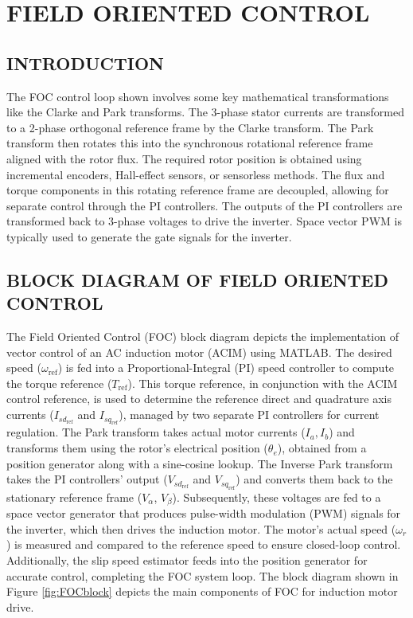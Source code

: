 
\section{\centering FIELD ORIENTED CONTROL}

\subsection{INTRODUCTION}

\hspace{0.2in}The FOC control loop shown involves some key mathematical transformations like the Clarke and Park transforms. The 3-phase stator currents are transformed to a 2-phase orthogonal reference frame by the Clarke transform. The Park transform then rotates this into the synchronous rotational reference frame aligned with the rotor flux. The required rotor position is obtained using incremental encoders, Hall-effect sensors, or sensorless methods. The flux and torque components in this rotating reference frame are decoupled, allowing for separate control through the PI controllers. The outputs of the PI controllers are transformed back to 3-phase voltages to drive the inverter. Space vector PWM is typically used to generate the gate signals for the inverter.
\subsection{BLOCK DIAGRAM OF FIELD ORIENTED CONTROL}

\hspace{0.2in}The Field Oriented Control (FOC) block diagram depicts the implementation of vector control of an AC induction motor (ACIM) using MATLAB. The desired speed ($\omega_{\text{ref}}$) is fed into a Proportional-Integral (PI) speed controller to compute the torque reference ($T_{\text{ref}}$). This torque reference, in conjunction with the ACIM control reference, is used to determine the reference direct and quadrature axis currents ($I_{sd_{\text{ref}}}$ and $I_{sq_{\text{ref}}}$), managed by two separate PI controllers for current regulation. The Park transform takes actual motor currents ($I_a, I_b$) and transforms them using the rotor's electrical position ($\theta_e$), obtained from a position generator along with a sine-cosine lookup. The Inverse Park transform takes the PI controllers' output ($V_{sd_{\text{ref}}}$ and $V_{sq_{\text{ref}}}$) and converts them back to the stationary reference frame ($V_{\alpha}$, $V_{\beta}$). Subsequently, these voltages are fed to a space vector generator that produces pulse-width modulation (PWM) signals for the inverter, which then drives the induction motor. The motor's actual speed ($\omega_r$) is measured and compared to the reference speed to ensure closed-loop control. Additionally, the slip speed estimator feeds into the position generator for accurate control, completing the FOC system loop. The block diagram shown in Figure \ref{fig:FOCblock} depicts the main components of FOC for induction motor drive.


